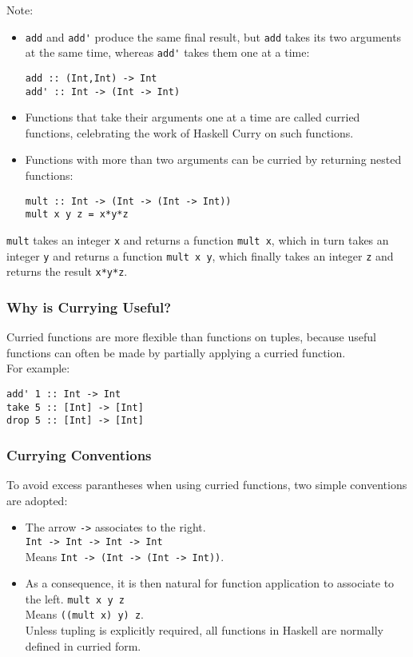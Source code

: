 \begin{multicols}{2}
Note:
\begin{itemize}
  \item \lstinline{add} and \lstinline{add'} produce the same final result, but \lstinline{add} takes its two arguments at the same time, whereas \lstinline{add'} takes them one at a time:
\begin{lstlisting}
add :: (Int,Int) -> Int
add' :: Int -> (Int -> Int)
\end{lstlisting}
  \item Functions that take their arguments one at a time are called curried functions, celebrating the work of Haskell Curry on such functions.
  \item Functions with more than two arguments can be curried by returning nested functions:
\begin{lstlisting}
mult :: Int -> (Int -> (Int -> Int))
mult x y z = x*y*z
\end{lstlisting}
\end{itemize}
\lstinline{mult} takes an integer \lstinline{x} and returns a function \lstinline{mult x}, which in turn takes an integer \lstinline{y} and returns a function \lstinline{mult x y}, which finally takes an integer \lstinline{z} and returns the result \lstinline{x*y*z}.

\subsubsection{Why is Currying Useful?}
Curried functions are more flexible than functions on tuples, because useful functions can often be made by partially applying a curried function.\\
For example:
\begin{lstlisting}
add' 1 :: Int -> Int
take 5 :: [Int] -> [Int]
drop 5 :: [Int] -> [Int]
\end{lstlisting}

\subsubsection{Currying Conventions}
To avoid excess parantheses when using curried functions, two simple conventions are adopted:
\begin{itemize}
  \item The arrow \lstinline{->} associates to the right.\\
        \lstinline{Int -> Int -> Int -> Int}\\
        Means \lstinline{Int -> (Int -> (Int -> Int))}.
\item As a consequence, it is then natural for function application to associate to the left.
      \lstinline{mult x y z}\\
      Means \lstinline{((mult x) y) z}.\\
      Unless tupling is explicitly required, all functions in Haskell are normally defined in curried form.
\end{itemize}


\end{multicols}

